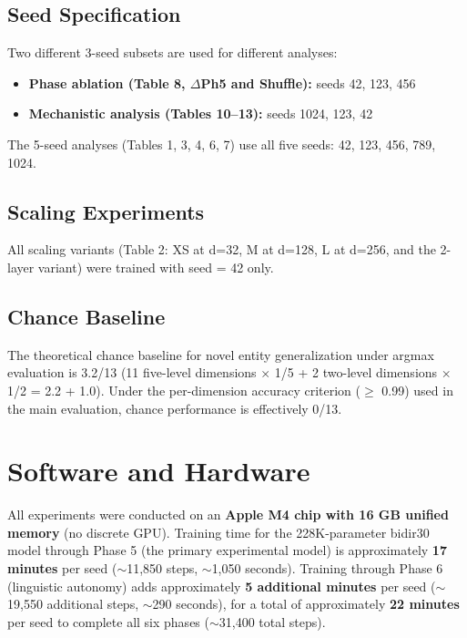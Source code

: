 \documentclass{article}
\begin{document}
\subsection{Seed Specification}

Two different 3-seed subsets are used for different analyses:
\begin{itemize}
    \item \textbf{Phase ablation (Table 8, $\Delta$Ph5 and Shuffle):} seeds 42, 123, 456
    \item \textbf{Mechanistic analysis (Tables 10--13):} seeds 1024, 123, 42
\end{itemize}

The 5-seed analyses (Tables 1, 3, 4, 6, 7) use all five seeds: 42, 123, 456, 789, 1024.

\subsection{Scaling Experiments}

All scaling variants (Table 2: XS at d=32, M at d=128, L at d=256, and the 2-layer variant) were trained with seed = 42 only.

\subsection{Chance Baseline}

The theoretical chance baseline for novel entity generalization under argmax evaluation is 3.2/13 (11 five-level dimensions $\times$ 1/5 + 2 two-level dimensions $\times$ 1/2 = 2.2 + 1.0). Under the per-dimension accuracy criterion ($\geq$ 0.99) used in the main evaluation, chance performance is effectively 0/13.

\section{Software and Hardware}

All experiments were conducted on an \textbf{Apple M4 chip with 16 GB unified memory} (no discrete GPU). Training time for the 228K-parameter bidir30 model through Phase 5 (the primary experimental model) is approximately \textbf{17 minutes} per seed ($\sim$11,850 steps, $\sim$1,050 seconds). Training through Phase 6 (linguistic autonomy) adds approximately \textbf{5 additional minutes} per seed ($\sim$19,550 additional steps, $\sim$290 seconds), for a total of approximately \textbf{22 minutes} per seed to complete all six phases ($\sim$31,400 total steps).
\end{document}
